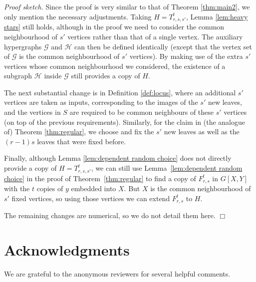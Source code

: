 \noindent \emph{Proof sketch.} Since the proof is very similar to that of Theorem \ref{thm:main2},  we only mention the necessary adjustments. Taking $H=T_{r,s,s'}^t$, Lemma \ref{lem:heavy stars} still holds, although in the proof we need to consider the common neighbourhood of $s'$ vertices rather than that of a single vertex. The auxiliary hypergraphs $\mathcal{G}$ and $\mathcal{H}$ can then be defined identically (except that the vertex set of $\mathcal{G}$ is the common neighbourhood of $s'$ vertices). By making use of the extra $s'$ vertices whose common neighbourhood we considered, the existence of a subgraph $\mathcal{H}$ inside $\mathcal{G}$ still provides a copy of $H$.

The next substantial change is in Definition \ref{def:locus}, where an additional $s'$ vertices are taken as inputs, corresponding to the images of the $s'$ new leaves, and the vertices in $S$ are required to be common neighbours of these $s'$ vertices (on top of the previous requirements). Similarly, for the claim in (the analogue of) Theorem \ref{thm:regular}, we choose and fix the $s'$ new leaves as well as the $(r-1)s$ leaves that were fixed before.

Finally, although Lemma \ref{lem:dependent random choice} does not directly provide a copy of $H=T_{r,s,s'}^t$, we can still use Lemma~\ref{lem:dependent random choice} in the proof of Theorem~\ref{thm:regular} to find a copy of $F_{r,s}^t$ in $G[X,Y]$ with the $t$ copies of $y$ embedded into $X$. But $X$ is the common neighbourhood of $s'$ fixed vertices, so using those vertices we can extend $F_{r,s}^t$ to $H$.

The remaining changes are numerical, so we do not detail them here. \hfill $\Box$



\section*{Acknowledgments} %
We are grateful to the anonymous reviewers for several helpful comments.

